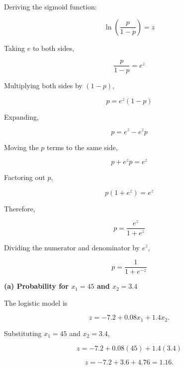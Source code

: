 \documentclass[12pt,a4paper]{article}
\begin{document}
Deriving the sigmoid function:

\begin{equation*}
\ln\left(\frac{p}{1-p}\right)=z
\end{equation*}

Taking $e$ to both sides,

\begin{equation*}
\frac{p}{1-p}=e^z
\end{equation*}

Multiplying both sides by $(1-p)$,

\begin{equation*}
p=e^z(1-p)
\end{equation*}

Expanding,

\begin{equation*}
p=e^z-e^zp
\end{equation*}

Moving the $p$ terms to the same side,

\begin{equation*}
p+e^zp=e^z
\end{equation*}

Factoring out $p$,

\begin{equation*}
p(1+e^z)=e^z
\end{equation*}

Therefore,

\begin{equation*}
p=\frac{e^z}{1+e^z}
\end{equation*}

Dividing the numerator and denominator by $e^z$,

\begin{equation}
p=\frac{1}{1+e^{-z}}
\label{eq:sigderiv}
\end{equation}

\textbf{(a) Probability for $x_1=45$ and $x_2=3.4$}

The logistic model is

\begin{equation*}
z=-7.2+0.08x_1+1.4x_2.
\end{equation*}

Substituting $x_1=45$ and $x_2=3.4$,

\begin{equation*}
z=-7.2+0.08(45)+1.4(3.4)
\end{equation*}

\begin{equation*}
z=-7.2+3.6+4.76=1.16.
\end{equation*}
\end{document}
